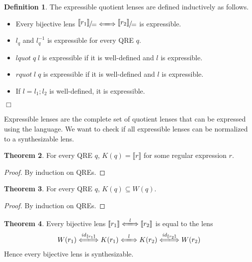 \documentclass[a4paper,11pt] {article}
\theoremstyle{definition}
\newtheorem{theorem}{Theorem}[section]
\newtheorem{definition}[theorem]{Definition}
\newcommand{\lquot}{\textit{lquot}}
\newcommand{\rquot}{\textit{rquot}}
\newcommand{\lensbetween}[1]{\xLongleftrightarrow{#1}}
\newcommand{\niceFrac}[2]{%
    \raise.5ex\hbox{$#1$}%
    \kern-.1em/\kern-.15em%
    \lower.25ex\hbox{$#2$}}
\begin{document}
\begin{definition}
  The expressible quotient lenses are defined inductively
  as follows.
  \begin{itemize}
  \item Every bijective lens
    $\niceFrac{\llbracket r_1 \rrbracket}{=} \lensbetween{}
    \niceFrac{\llbracket r_2 \rrbracket}{=}$
    is expressible.
  \item $l_q$ and $l_q^{-1}$ is expressible for every QRE $q$.
  \item $\lquot \; q \; l$ is expressible if it is well-defined
    and $l$ is expressible.
  \item $\rquot \; l \; q$ is expressible if it is well-defined
    and $l$ is expressible.
  \item If $l = l_1; l_2$ is well-defined, it is expressible.
  \end{itemize}
  \begin{flushright} $\Box$ \end{flushright}
\end{definition}
Expressible lenses are the complete set of quotient lenses that can
be expressed using the language.
We want to check if all expressible lenses can be normalized to a
synthesizable lens.

\begin{theorem}
  \label{thm:kernel-rep}
  For every QRE $q$, $K(q) = \llbracket r \rrbracket$ for some
  regular expression $r$.
\end{theorem}
\begin{proof}
  By induction on QREs.
\end{proof}

\begin{theorem}
  \label{thm:kq-subset-wq}
  For every QRE $q$, $K(q) \subseteq W(q)$. 
\end{theorem}
\begin{proof}
  By induction on QREs.
\end{proof}

\begin{theorem}
  \label{thm:bijective-syn}
  Every bijective lens
  $\llbracket r_1 \rrbracket \lensbetween{l} \llbracket r_2
  \rrbracket$
  is equal to the lens
  \begin{align*}
    W(r_1) \lensbetween{\mathit{id}_{\llbracket r_1 \rrbracket}} K(r_1)
    \lensbetween{l}
    K(r_2) \lensbetween{\mathit{id}_{\llbracket r_2 \rrbracket}} W(r_2)
  \end{align*}
  Hence every bijective lens is synthesizable.
\end{theorem}
\end{document}
